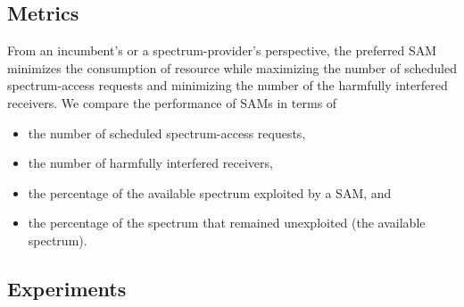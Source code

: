 \documentclass[12pt, draftclsnofoot, onecolumn]{IEEEtran}
\begin{document}
\subsection{Metrics}
From an incumbent's or a spectrum-provider's perspective, the preferred SAM minimizes the consumption of resource while maximizing the number of scheduled spectrum-access requests and minimizing the number of the harmfully interfered receivers. We compare the performance of SAMs in terms of
\begin{itemize}
	\item the number of scheduled spectrum-access requests,
  \item the number of harmfully interfered receivers, 
  \item the percentage of the available spectrum exploited by a SAM, and
	\item the percentage of the spectrum that remained unexploited (the available spectrum).
\end{itemize}

\subsection{Experiments}
\end{document}
